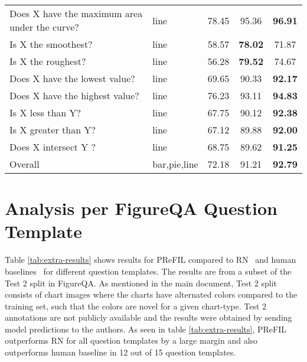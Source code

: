 \documentclass[10pt,twocolumn]{article}
\begin{document}
\begin{table*}
\begin{tabular}{@{}llccc@{}}
Does X have the maximum area under the curve? & line                  & 78.45                     & 95.36                     & \textbf{96.91}                     \\
Is X the smoothest?                           & line                  & 58.57                     & \textbf{78.02}            & 71.87                              \\
Is X the roughest?                            & line                  & 56.28                     & \textbf{79.52}            & 74.67                              \\
Does X have the lowest value?                 & line                  & 69.65                     & 90.33                     & \textbf{92.17}                     \\
Does X have the highest value?                & line                  & 76.23                     & 93.11                     & \textbf{94.83}                     \\
Is X less than Y?                             & line                  & 67.75                     & 90.12                     & \textbf{92.38}                     \\
Is X greater than Y?                          & line                  & 67.12                     & 89.88                     & \textbf{92.00}                     \\
Does X intersect Y ?                          & line                  & 68.75                     & 89.62                     & \textbf{91.25}                     \\ \midrule
Overall                                       & bar,pie,line                     & 72.18 & 91.21 & \textbf{92.79} \\ \bottomrule
\end{tabular}
\label{fig:frontpage}
\end{table*}

\section{Analysis per FigureQA Question Template}

Table \ref{tab:extra-results} shows results for PReFIL compared to RN~\cite{santoro2017simple,figureqa} and human baselines~\cite{figureqa} for different question templates. The results are from a subset of the Test 2 split in FigureQA. As mentioned in the main document, Test 2 split consists of chart images where the charts have alternated colors compared to the training set, such that the colors are novel for a given chart-type. Test 2 annotations are not publicly available and the results were obtained by sending model predictions to the authors. As seen in table \ref{tab:extra-results}, PReFIL outperforms RN for all question templates by a large margin and also outperforms human baseline in 12 out of 15 question templates.
\end{document}
